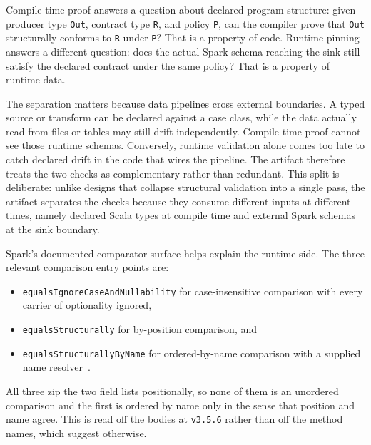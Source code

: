 Compile-time proof answers a question about declared program structure: given producer type \texttt{Out}, contract type \texttt{R}, and policy \texttt{P}, can the compiler prove that \texttt{Out} structurally conforms to \texttt{R} under \texttt{P}? That is a property of code. Runtime pinning answers a different question: does the actual Spark schema reaching the sink still satisfy the declared contract under the same policy? That is a property of runtime data.

The separation matters because data pipelines cross external boundaries. A typed source or transform can be declared against a case class, while the data actually read from files or tables may still drift independently. Compile-time proof cannot see those runtime schemas. Conversely, runtime validation alone comes too late to catch declared drift in the code that wires the pipeline. The artifact therefore treats the two checks as complementary rather than redundant. This split is deliberate: unlike designs that collapse structural validation into a single pass, the artifact separates the checks because they consume different inputs at different times, namely declared Scala types at compile time and external Spark schemas at the sink boundary.

Spark's documented comparator surface helps explain the runtime side. The three relevant comparison entry points are:

\begin{itemize}[leftmargin=1.5em]
  \item \texttt{equalsIgnoreCaseAndNullability} for case-insensitive comparison with every carrier of optionality ignored,
  \item \texttt{equalsStructurally} for by-position comparison, and
  \item \texttt{equalsStructurallyByName} for ordered-by-name comparison with a supplied name resolver~\cite{spark_datatype}.
\end{itemize}

All three zip the two field lists positionally, so none of them is an unordered comparison and the first is ordered by name only in the sense that position and name agree. This is read off the bodies at \texttt{v3.5.6} rather than off the method names, which suggest otherwise.


